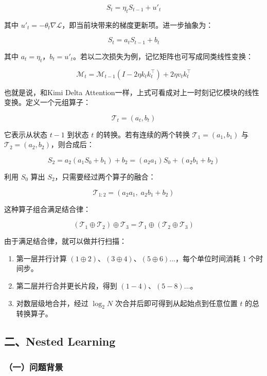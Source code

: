 \[
S_t = \eta_t S_{t-1} + u'_t
\]

其中 \(u'_t=-\theta_t\nabla\mathcal{L}\)，即当前块带来的梯度更新项。进一步抽象为：

\[
S_t = a_t S_{t-1}+b_t
\]

其中 \(a_t=\eta_t\)，\(b_t=u'_t\)。若以二次损失为例，记忆矩阵也可写成同类线性变换：

\[
\mathcal{M}_t
=
\mathcal{M}_{t-1}(I-2\eta k_tk_t^\top)
 + 2\eta v_tk_t^\top
\]

也就是说，和Kimi Delta Attention一样，上式可看成对上一时刻记忆模块的线性变换。定义一个元组算子：

\[
\mathcal{T}_t=(a_t,b_t)
\]

它表示从状态 \(t-1\) 到状态 \(t\) 的转换。若有连续的两个转换 \(\mathcal{T}_1=(a_1,b_1)\) 与 \(\mathcal{T}_2=(a_2,b_2)\)，则合成后：

\[
S_2 = a_2(a_1S_0+b_1)+b_2
= (a_2a_1)S_0+(a_2b_1+b_2)
\]

利用 \(S_0\) 算出 \(S_2\)，只需要经过两个算子的融合：

\[
\mathcal{T}_{1:2}=(a_2a_1,\;a_2b_1+b_2)
\]

这种算子组合满足结合律：

\[
(\mathcal{T}_1\oplus\mathcal{T}_2)\oplus\mathcal{T}_3
=
\mathcal{T}_1\oplus(\mathcal{T}_2\oplus\mathcal{T}_3)
\]

由于满足结合律，就可以做并行扫描：

\begin{enumerate}
\def\labelenumi{\arabic{enumi}.}
\tightlist
\item
  第一层并行计算 \((1\oplus2)\)、\((3\oplus4)\)、\((5\oplus6)\ldots\)，每个单位时间消耗 1 个时间步。
\item
  第二层并行合并更长片段，得到 \((1-4)\)、\((5-8)\ldots\)。
\item
  对数层级地合并，经过 \(\log_2 N\) 次合并后即可得到从起始点到任意位置 \(t\) 的总转换算子。
\end{enumerate}

\hypertarget{ux4e8cnested-learning}{%
\subsection{二、Nested Learning}\label{ux4e8cnested-learning}}

\hypertarget{ux4e00ux95eeux9898ux80ccux666f-3}{%
\subsubsection{（一）问题背景}\label{ux4e00ux95eeux9898ux80ccux666f-3}}

